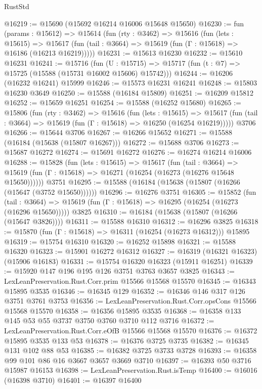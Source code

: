 \begin{lexlean}{RustStd}
\begin{coremodule}
@16219 := @15690 (@15692 @16214 @16006 @15648 @15650)
@16230 := fun (params : @15612) =>
  @15614
    (fun (rty : @3462) =>
    @15616
      (fun (lets : @15615) =>
      @15617 (fun (tail : @3664) => @15619 (fun (Γ : @15618) => @16186 (@16213 @16219)))))
@16231 := @15613 @16230
@16232 := @15610 @16231
@16241 := @15716
    (fun (U : @15715) => @15717 (fun (t : @7) => @15725 (@15588 (@15731 @16002 @15606) @15742)))
@16244 := @16206 (@16232 @16241) @15999
@16246 := @15573 @16231 @16241
@16248 := @15803 @16230 @3649
@16250 := @15588 (@16184 @15809)
@16251 := @16209 @15812
@16252 := @15659 @16251
@16254 := @15588 (@16252 @15680)
@16265 := @15806
    (fun (rty : @3462) =>
    @15616
      (fun (lets : @15615) =>
      @15617 (fun (tail : @3664) => @15619 (fun (Γ : @15618) => @16250 (@16254 @16219)))))
    @3706
@16266 := @15644 @3706
@16267 := @16266 @15652
@16271 := @15588 (@16184 (@15638 (@15807 @16267)))
@16272 := @15688 @3706
@16273 := @15687 @16272
@16274 := @15691 @16272
@16276 := @16274 @16214 @16006
@16288 := @15828
    (fun (lets : @15615) =>
    @15617
      (fun (tail : @3664) =>
      @15619 (fun (Γ : @15618) => @16271 (@16254 (@16273 (@16276 @15648 @15650))))))
    @3751
@16295 := @15588 (@16184 (@15638 (@15807 (@16266 (@15647 (@3752 @15650))))))
@16296 := @16276 @3751
@16305 := @15852
    (fun (tail : @3664) => @15619 (fun (Γ : @15618) => @16295 (@16254 (@16273 (@16296 @15650)))))
    @3825
@16310 := @16184 (@15638 (@15807 (@16266 (@15647 @3826))))
@16311 := @15588 @16310
@16312 := @16296 @3825
@16318 := @15870 (fun (Γ : @15618) => @16311 (@16254 (@16273 @16312))) @15895
@16319 := @15754 @16310
@16320 := @16252 @15898
@16321 := @15588 @16320
@16323 := @15901 @16272 @16312
@16327 := @16319 (@16321 @16323) (@15906 @16183)
@16331 := @15754 @16320 @16323 (@15911 @16251)
@16339 := @15920 @147 @196 @195 @126 @3751 @3763 @3657 @3825
@16343 := LexLeanPreservation.Rust.Corr.prim @15566 @15568 @15570
@16345 := @16343 @15895 @3535
@16346 := @16345 @129
@16352 := @16346 @146 @317 @126 @3751 @3761 @3753
@16356 := LexLeanPreservation.Rust.Corr.opsCons @15566 @15568 @15570
@16358 := @16356 @15895 @3535
@16368 := @16358 @133 @145 @53 @55 @3737 @3750 @3760 @3710 @112 @3716
@16372 := LexLeanPreservation.Rust.Corr.eOfB @15566 @15568 @15570
@16376 := @16372 @15895 @3535 @133 @53
@16378 := @16376 @3725 @3735
@16382 := @16345 @131 @102 @88 @53
@16385 := @16382 @3725 @3733 @3728
@16393 := @16358 @99 @101 @86 @16 @3667 @3657 @3669 @3710
@16397 := @16393 @50 @3716 @15987 @16153
@16398 := LexLeanPreservation.Rust.isTemp
@16400 := @16016 (@16398 @3710)
@16401 := @16397 @16400

\end{coremodule}
\end{lexlean}
